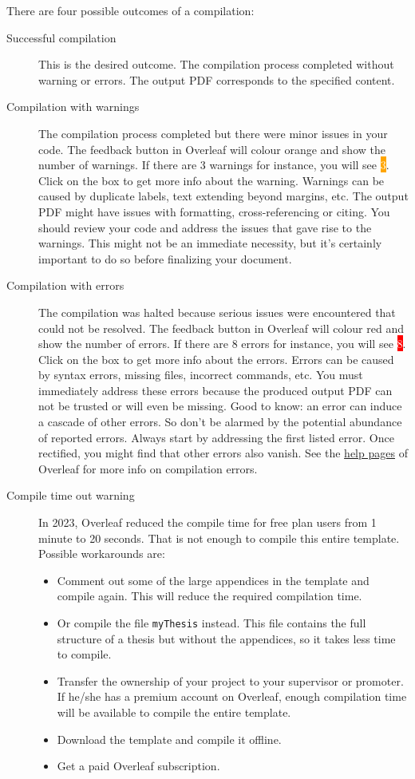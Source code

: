 There are four possible outcomes of a compilation:
\begin{description}
    \item [Successful compilation] This is the desired outcome. The compilation process completed without warning or errors. The output PDF corresponds to the specified content.
    \item [Compilation with warnings] The compilation process completed but there were minor issues in your code. The feedback button in Overleaf will colour orange and show the number of warnings. If there are 3 warnings for instance, you will see \colorbox{orange}{\textcolor{white}{3}}. Click on the box to get more info about the warning. Warnings can be caused by duplicate labels, text extending beyond margins, etc. The output PDF might have issues with formatting, cross-referencing or citing. You should review your code and address the issues that gave rise to the warnings. This might not be an immediate necessity, but it's certainly important to do so before finalizing your document.
    \item [Compilation with errors] The compilation was halted because serious issues were encountered that could not be resolved. The feedback button in Overleaf will colour red and show the number of errors. If there are 8 errors for instance, you will see \colorbox{red}{\textcolor{white}{8}}. Click on the box to get more info about the errors. Errors can be caused by syntax errors, missing files, incorrect commands, etc. You must immediately address these errors because the produced output PDF can not be trusted or will even be missing. Good to know: an error can induce a cascade of other errors. So don't be alarmed by the potential abundance of reported errors. Always start by addressing the first listed error. Once rectified, you might find that other errors also vanish. See the \href{https://www.overleaf.com/learn/latex/Errors}{help pages} of Overleaf for more info on compilation errors.
    \item [Compile time out warning]\label{sec:timeout} In 2023, Overleaf reduced the compile time for free plan users from 1 minute to 20 seconds. That is not enough to compile this entire template. Possible workarounds are:
    \begin{itemize}
        \item Comment out some of the large appendices in the template and compile again. This will reduce the required compilation time.
        \item Or compile the file \texttt{myThesis} instead. This file contains the full structure of a thesis but without the appendices, so it takes less time to compile.
        \item Transfer the ownership of your project to your supervisor or promoter. If he/she has a premium account on Overleaf, enough compilation time will be available to compile the entire template.
        \item Download the template and compile it offline.
        \item Get a paid Overleaf subscription.
    \end{itemize}

\end{description}

